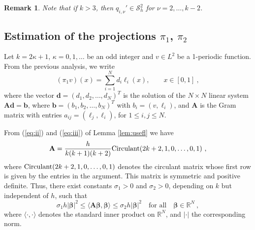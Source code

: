 \documentclass{amsart}
\newcommand{\bd}{\mathbf{d}}
\newcommand{\bb}{\mathbf{b}}
\newcommand{\bA}{\mathbf{A}}
\newcommand{\bbeta}{\boldsymbol{\beta}}
\newtheorem{remark}{Remark}[section]
\begin{document}
\begin{remark}\label{rmk:qim}
Note that if $k>3$, then $q_{i,\nu}'\in \mathcal{S}_h^2$ for $\nu=2,\dots, k-2$.
\end{remark}

\subsection{Estimation of the projections $\pi_1$, $\pi_2$}

Let $k=2\kappa+1$, $\kappa=0,1,\dots$ be an odd integer and $v\in L^2$ be a 1-periodic function. From the previous analysis, we write 
\begin{equation}\label{eq:repr1}
(\pi_1 v)(x)=\sum_{i=1}^Nd_i \ell_i(x),\qquad x\in [0,1]\ ,
\end{equation}
 where the vector $\bd=(d_1,d_2,\dots,d_N)^T$ is the solution of the $N\times N$ linear system $\bA\bd=\bb$, where $\bb=(b_1,b_2,\dots, b_N)^T$ with $b_i=(v,\ell_i)$, and $\bA$ is the Gram matrix with entries $a_{ij}=(\ell_j,\ell_i)$, for $1\leq i,j\leq N$. 

From (\ref{eq:ii}) and (\ref{eq:iii}) of Lemma \ref{lem:usefl} we have
$$
\bA=\frac{h}{k(k+1)(k+2)}{\rm Circulant}(2k+2, 1, 0, \dots, 0, 1)\ ,
$$
where ${\rm Circulant}(2k+2, 1, 0, \dots, 0, 1)$ denotes the circulant matrix whose first row is given by the entries in the argument. This matrix is symmetric and positive definite.
%
%
%
Thus, there exist constants $\sigma_1>0$ and $\sigma_2>0$, depending on $k$ but independent of $h$, such that
\begin{equation}\label{eq:twopone}
\sigma_1 h|\bbeta|^2\leq \langle \bA\bbeta,\bbeta\rangle \leq \sigma_2 h|\bbeta|^2 \quad \text{for all}\quad \bbeta\in \mathbb{R}^N\ ,
\end{equation}
where $\langle\cdot,\cdot\rangle$ denotes the standard inner product on $\mathbb{R}^N$, and $|\cdot|$ the corresponding norm.
\end{document}

